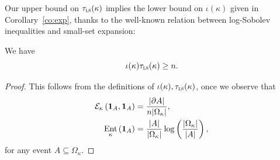 \documentclass[AHL,Unicode,longabstracts,published]{cedram}
\newcommand{\cE}{\mathcal{E}}
\newcommand{\tls}{\tau_{\textsc{ls}}}
\newcommand{\bfun}{\bf 1}
\DeclareMathOperator{\ent}{Ent}
\begin{document}
Our upper bound on $\tls(\kappa)$ implies the lower bound on $\iota(\kappa)$ given in Corollary~\ref{co:exp}, thanks to the well-known relation between log-Sobolev inequalities and small-set expansion:
\begin{lemm}\label{lm:vs}
We have
\[
\iota(\kappa)\tls(\kappa) \ge n.
\]
\end{lemm}

\begin{proof}
This follows from the definitions of $\iota(\kappa),\tls(\kappa)$, once we observe that
\begin{align*}
\cE_\kappa\left({\bfun}_A,{\bfun}_A\right) & = \frac{|\partial A|}{n|\Omega_\kappa|},\\
\ent_\kappa\left({\bfun}_A\right) & = \frac{|A|}{|\Omega_\kappa|}\log\left(\frac{|\Omega_\kappa|}{|A|}\right),
\end{align*}
for any event $A\subseteq \Omega_\kappa$.
\end{proof}
\end{document}
